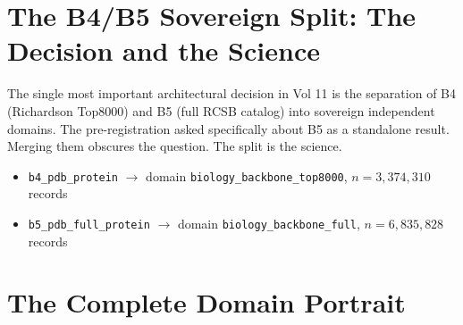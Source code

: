 \documentclass[11pt, letterpaper, openany]{book}
\begin{document}
\section{The B4/B5 Sovereign Split: The Decision and the Science}

The single most important architectural decision in Vol 11 is the separation
of B4 (Richardson Top8000) and B5 (full RCSB catalog) into sovereign
independent domains. The pre-registration asked specifically about B5 as a
standalone result. Merging them obscures the question. The split is the science.

\begin{itemize}
  \item \texttt{b4\_pdb\_protein} $\rightarrow$ domain \texttt{biology\_backbone\_top8000},
    $n = 3{,}374{,}310$ records
  \item \texttt{b5\_pdb\_full\_protein} $\rightarrow$ domain \texttt{biology\_backbone\_full},
    $n = 6{,}835{,}828$ records
\end{itemize}

\section{The Complete Domain Portrait}
\end{document}
